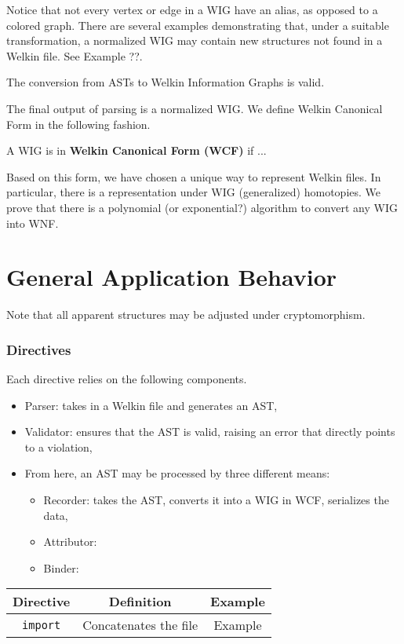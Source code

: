   Notice that not every vertex or edge in a WIG have an alias, as opposed to a colored graph. There are several examples demonstrating that, under a suitable transformation, a normalized WIG may contain new structures not found in a Welkin file. See Example ??.
\begin{lemma}
The conversion from ASTs to Welkin Information Graphs is valid.
\end{lemma}
The final output of parsing is a normalized WIG. We define Welkin Canonical Form in the following fashion.
\begin{definition}
A WIG is in \textbf{Welkin Canonical Form (WCF)} if ...
\end{definition}
Based on this form, we have chosen a unique way to represent Welkin files. In particular, there is a representation under WIG (generalized) homotopies. We prove that there is a polynomial (or exponential?) algorithm to convert any WIG into WNF.

\section{General Application Behavior}

Note that all apparent structures may be adjusted under cryptomorphism.
\subsubsection*{Directives}
Each directive relies on the following components.
\begin{itemize}
  \item Parser: takes in a Welkin file and generates an AST,
  \item Validator: ensures that the AST is valid, raising an error that directly points to a violation,
  \item From here, an AST may be processed by three different means:
		\begin{itemize}
		  \item Recorder: takes the AST, converts it into a WIG in WCF, serializes the data,
		  \item Attributor: %
		  \item Binder:
		\end{itemize}
\end{itemize}
\begin{center}
  \begin{tabular}{| c | c | c |}
	Directive & Definition & Example \\
	\hline
	\texttt{import} & Concatenates the file & Example

  \end{tabular}
\end{center}




